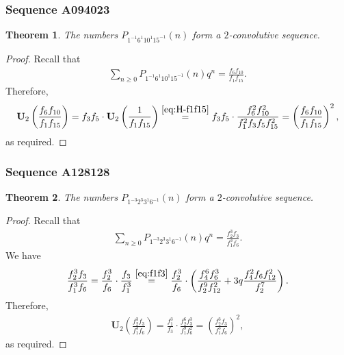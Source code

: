 \documentclass[12pt,reqno]{amsart}
\numberwithin{equation}{section}
\theoremstyle{plain}
\newtheorem{theorem}{Theorem}[section]
\theoremstyle{definition}
\theoremstyle{named}
\newcommand{\UU}{\mathbf{U}}
\begin{document}
\subsubsection{Sequence A094023}

\begin{theorem}\label{th:A094023}
	The numbers $P_{1^{-1} 6^1 10^{1} 15^{-1}}(n)$ form a $2$-convolutive sequence.
\end{theorem}

\begin{proof}
	Recall that
	\begin{align*}
		\sum_{n\ge 0} P_{1^{-1} 6^1 10^{1} 15^{-1}}(n) q^n = \frac{f_6 f_{10}}{f_1 f_{15}}.
	\end{align*}
	Therefore,
	\begin{align*}
		\UU_2\left(\frac{f_6 f_{10}}{f_1 f_{15}}\right) = f_3 f_5\cdot \UU_2\left(\frac{1}{f_1 f_{15}}\right) \overset{\eqref{eq:H-f1f15}}{=} f_3 f_5\cdot \frac{f_{6}^2f_{10}^2}{f_1^2f_3f_{5}f_{15}^2} = \left(\frac{f_6 f_{10}}{f_1 f_{15}}\right)^2,
	\end{align*}
	as required.
\end{proof}

\subsubsection{Sequence A128128}

\begin{theorem}\label{th:A128128}
	The numbers $P_{1^{-3} 2^3 3^{1} 6^{-1}}(n)$ form a $2$-convolutive sequence.
\end{theorem}

\begin{proof}
	Recall that
	\begin{align*}
		\sum_{n\ge 0} P_{1^{-3} 2^3 3^{1} 6^{-1}}(n) q^n = \frac{f_2^3 f_{3}}{f_1^3 f_{6}}.
	\end{align*}
	We have
	\begin{align*}
		\frac{f_2^3 f_{3}}{f_1^3 f_{6}} = \frac{f_2^3}{f_{6}}\cdot \frac{f_{3}}{f_1^3} \overset{\eqref{eq:f1f3}}{=} \frac{f_2^3}{f_{6}}\cdot \left(\frac{f_4^6f_6^3}{f_2^9f_{12}^2}+3q\frac{f_4^2f_6f_{12}^2}{f_2^7}\right).
	\end{align*}
	Therefore,
	\begin{align*}
		\UU_2\left(\frac{f_2^3 f_{3}}{f_1^3 f_{6}}\right) = \frac{f_1^3}{f_{3}}\cdot \frac{f_2^6f_3^3}{f_1^9f_{6}^2} = \left(\frac{f_2^3 f_{3}}{f_1^3 f_{6}}\right)^2,
	\end{align*}
	as required.
\end{proof}
\end{document}
